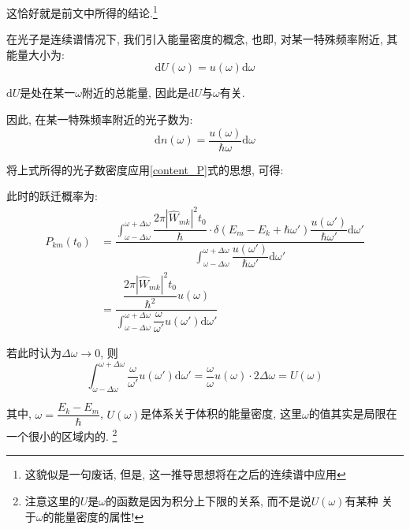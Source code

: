 \documentclass[a4paper, 11pt]{article}
\begin{document}
\begin{spacing}{1.2}
        这恰好就是前文中所得的结论.\footnote{这貌似是一句废话, 但是, 这一推导思想将在之后的连续谱中应用}
        
        在光子是连续谱情况下, 我们引入能量密度的概念, 也即, 对某一特殊频率附近, 其能量大小为:
        \begin{equation}
          \mathrm{d}U(\omega) = u(\omega)\mathrm{d}\omega
        \end{equation}
        
        $\mathrm{d}U$是处在某一$\omega$附近的总能量, 因此是$\mathrm{d}U$与$\omega$有关. 

        因此, 在某一特殊频率附近的光子数为:
        \begin{equation}
          \mathrm{d}n(\omega) = \frac{u(\omega)}{\hbar\omega}\mathrm{d}\omega
        \end{equation}

        将上式所得的光子数密度应用\eqref{content_P}式的思想, 可得:
        \par
        此时的跃迁概率为:
        \begin{equation}
          \begin{aligned}
            P_{km}(t_0) &= \dfrac{\int_{\omega-\Delta\omega}^{\omega+\Delta\omega}
                           \dfrac{2\pi|\hat{W}_{mk}|^2t_0}{\hbar}
                           \cdot\delta(E_m-E_k+\hbar\omega')
                           \dfrac{u(\omega')}{\hbar\omega'}\mathrm{d}\omega'}
                           {\int_{\omega-\Delta\omega}^{\omega+\Delta\omega}
                           \dfrac{u(\omega')}{\hbar\omega'}\mathrm{d}\omega'}\\
                        &= \dfrac{\dfrac{2\pi|\hat{W}_{mk}|^2t_0}{\hbar^2}u(\omega)}
                           {\int_{\omega-\Delta\omega}^{\omega+\Delta\omega}
                            \dfrac{\omega}{\omega'}u(\omega')\mathrm{d}\omega'}
          \end{aligned}
        \end{equation}

        若此时认为$\Delta\omega\to0$, 则
        \begin{equation}
          {\int_{\omega-\Delta\omega}^{\omega+\Delta\omega}
          \dfrac{\omega}{\omega'}u(\omega')\mathrm{d}\omega'} 
          =
          \dfrac{\omega}{\omega}u(\omega)\cdot2\Delta\omega
          =
          U(\omega)
        \end{equation}

        其中, $\omega = \dfrac{E_k-E_m}{\hbar}$, $U(\omega)$是体系关于体积的能量密度, 这里$\omega$的值其实是局限在一个很小的区域内的.
        \footnote{注意这里的$U$是$\omega$的函数是因为积分上下限的关系, 而不是说$U(\omega)$有某种
        关于$\omega$的能量密度的属性!}


\end{spacing}
\end{document}
